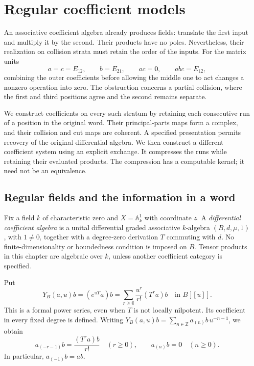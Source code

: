 \chapter{Regular coefficient models}
\label{v4-ch:regular-coefficient-models}

An associative coefficient algebra already produces fields:
translate the first input and multiply it by the second.
Their products have no poles. Nevertheless, their realization
on collision strata must retain the order of the inputs.
For the matrix units
\[
 a=c=E_{12},\qquad b=E_{21},
 \qquad ac=0,\qquad abc=E_{12},
\]
combining the outer coefficients before allowing the middle one
to act changes a nonzero operation into zero. The obstruction
concerns a partial collision, where the first and third positions
agree and the second remains separate.

We construct coefficients on every such stratum by retaining each
consecutive run of a position in the original word. Their
principal-parts maps form a complex, and their collision and cut
maps are coherent. A specified presentation permits recovery of
the original differential algebra. We then construct a different
coefficient system using an explicit exchange. It compresses the
runs while retaining their evaluated products. The compression
has a computable kernel; it need not be an equivalence.

\section{Regular fields and the information in a word}
\label{v4-sec:regular-fields}

Fix a field \(k\) of characteristic zero and \(X=\mathbb A^1_k\)
with coordinate \(z\). A \emph{differential coefficient algebra}
is a unital differential graded associative \(k\)-algebra
\((B,d,\mu,1)\), with \(1\ne0\), together with a degree-zero
derivation \(T\) commuting with \(d\). No finite-dimensionality
or boundedness condition is imposed on \(B\). Tensor products
in this chapter are algebraic over \(k\), unless another
coefficient category is specified.

Put
\begin{equation}\label{v4-eq:regular-field}
 Y_B(a,u)b=(e^{uT}a)b
          =\sum_{r\geq0}\frac{u^r}{r!}(T^ra)b
          \quad\text{in }B[[u]].
\end{equation}
This is a formal power series, even when \(T\) is not locally
nilpotent. Its coefficient in every fixed degree is defined.
Writing \(Y_B(a,u)b=\sum_{n\in\mathbb Z}a_{(n)}b\,u^{-n-1}\),
we obtain
\[
 a_{(-r-1)}b=\frac{(T^ra)b}{r!}\quad(r\geq0),
 \qquad a_{(n)}b=0\quad(n\geq0).
\]
In particular, \(a_{(-1)}b=ab\).

